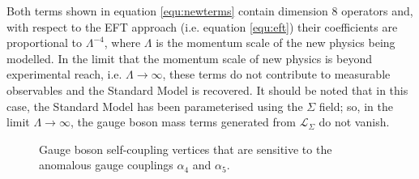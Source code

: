 Both terms shown in equation \ref{equ:newterms} contain dimension 8 operators \cite{Degrande:2013rea} and, with respect to the EFT approach (i.e. equation \ref{equ:eft}) their coefficients are proportional to $\Lambda^{-4}$, where $\Lambda$ is the momentum scale of the new physics being modelled.  In the limit that the momentum scale of new physics is beyond experimental reach, i.e. $\Lambda \rightarrow \infty$, these terms do not contribute to measurable observables and the Standard Model is recovered.  It should be noted that in this case, the Standard Model has been parameterised using the $\Sigma$ field; so, in the limit $\Lambda \rightarrow \infty$, the gauge boson mass terms generated from $\mathcal{L}_{\Sigma}$ do not vanish.  

\begin{figure}[h!]
\caption[Gauge boson self-coupling vertices that are sensitive to the anomalous gauge couplings $\alpha_{4}$ and $\alpha_{5}$.]{Gauge boson self-coupling vertices that are sensitive to the anomalous gauge couplings $\alpha_{4}$ and $\alpha_{5}$.}
\label{fig:agcvertices}
\end{figure}
